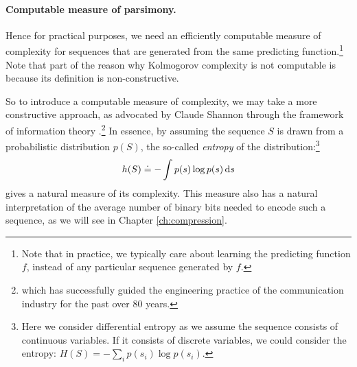 \documentclass[../../book-main.tex]{subfiles}
\begin{document}
\paragraph{Computable measure of parsimony.}
Hence for practical purposes, we need an efficiently computable measure of complexity for sequences that are generated from the same predicting function.\footnote{Note that in practice, we typically care about learning the predicting function $f$, instead of any particular sequence generated by $f$.} Note that part of the reason why Kolmogorov complexity is not computable is because its definition is non-constructive.

So to introduce a computable measure of complexity, we may take a more constructive approach, as advocated by Claude Shannon through the framework of information theory \cite{Shannon-1948,Cover-Thomas}.\footnote{which has successfully guided the engineering practice of the communication industry for the past over 80 years.} In essence, by assuming the sequence $S$ is drawn from a probabilistic distribution $p(S)$, the so-called {\em entropy} of the distribution:\footnote{Here we consider differential entropy as we assume the sequence consists of continuous variables. If it consists of discrete variables, we could consider the entropy: $H(S) = - \sum_{i}p(s_i) \log p(s_i).$ }
\begin{equation}
    h(S) \doteq -\int p(s) \log p(s) \odif{s}
    \label{eqn:entropy-definition}
\end{equation}
gives a natural measure of its complexity. This measure also has a natural interpretation of the average number of binary bits needed to encode such a sequence, as we will see in Chapter \ref{ch:compression}.
\end{document}
